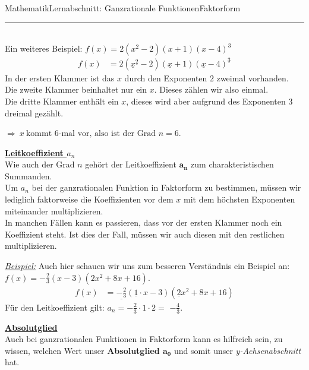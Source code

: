 \documentclass[11pt,twocolumn,oneside,openany,headings=optiontotoc,11pt,numbers=noenddot]{article}
\begin{document}
\begin{worksheet}{Mathematik}{Lernabschnitt: Ganzrationale Funktionen}{Faktorform}
		\rule{0.48\textwidth}{0.1pt}\\
		Ein weiteres Beispiel: \(f(x) = 2(x^2-2)(x+1)(x-4)^3\)\\
		\begin{align*}
			f(x) & = 2(\underline{x}^{\underline{2}}-2)(\underline{x}+1)(\underline{x}-4)^{\underline{3}}	
		\end{align*}
		In der ersten Klammer ist das \(x\) durch den Exponenten \(2\) zweimal vorhanden.\\
		Die zweite Klammer beinhaltet nur ein \(x\). Dieses zählen wir also einmal.\\
		Die dritte Klammer enthält ein \(x\), dieses wird aber aufgrund des Exponenten \(3\) dreimal gezählt.
		\par\noindent
		\(\Rightarrow\ x\ \text{kommt\ } 6\text{-mal\ vor,\ also\ ist\ der\ Grad}\) \colorbox{green!10}{\(n = 6\)}.\\
		\par\noindent
		\underline{\textbf{Leitkoeffizient \(a_n\)}}\\
		Wie auch der Grad \(n\) gehört der Leitkoeffizient \(\mathbf{a_n}\) zum charakteristischen Summanden.\\
		Um \(a_n\) bei der ganzrationalen Funktion in Faktorform zu bestimmen, müssen wir lediglich faktorweise die Koeffizienten vor dem \(x\) mit dem höchsten Exponenten miteinander multiplizieren.\\
		In manchen Fällen kann es passieren, dass vor der ersten Klammer noch ein Koeffizient steht. Ist dies der Fall, müssen wir auch diesen mit den restlichen multiplizieren.\\
		\par\noindent
		\textit{\underline{Beispiel:}} Auch hier schauen wir uns zum besseren Verständnis ein Beispiel an: \(f(x) = -\frac{2}{3}(x-3)(2x^2+8x+16)\).
		\begin{align*}
			f(x) & = \underline{-\frac{2}{3}}(\underline{1}\cdot{}x-3)(\underline{2}x^2 + 8x +16)
		\end{align*}
		Für den Leitkoeffizient gilt: \(a_n = -\frac{2}{3}\cdot1\cdot{}2 =\) \colorbox{green!10}{\(-\frac{4}{3}\)}.\\
		\par\noindent
		\textbf{\underline{Absolutglied}}\\
		Auch bei ganzrationalen Funktionen in Faktorform kann es hilfreich sein, zu wissen, welchen Wert unser \textbf{Absolutglied \(\mathbf{a_0}\)} und somit unser \textit{y-Achsenabschnitt} hat.\\

\end{worksheet}
\end{document}
